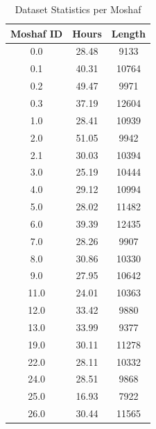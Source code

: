 \begin{table}[t]
	\centering
	\caption{Dataset Statistics per Moshaf}
	\label{tab:moshaf}
	\begin{tabular}{ccc}
		\hline
		\textbf{Moshaf ID} & \textbf{Hours}       & \textbf{Length} \\
		\hline
		0.0                & 28.48                & 9133            \\
		0.1                & 40.31                & 10764           \\
		0.2                & 49.47                & 9971            \\
		0.3                & 37.19                & 12604           \\
		1.0                & 28.41                & 10939           \\
		2.0                & 51.05                & 9942            \\
		2.1                & 30.03                & 10394           \\
		3.0                & 25.19                & 10444           \\
		4.0                & 29.12                & 10994           \\
		5.0                & 28.02                & 11482           \\
		6.0                & 39.39                & 12435           \\
		7.0                & 28.26                & 9907            \\
		8.0                & 30.86                & 10330           \\
		9.0                & 27.95                & 10642           \\
		11.0               & 24.01                & 10363           \\
		12.0               & 33.42                & 9880            \\
		13.0               & 33.99                & 9377            \\
		19.0               & 30.11                & 11278           \\
		22.0               & 28.11                & 10332           \\
		24.0               & 28.51                & 9868            \\
		25.0               & 16.93                & 7922            \\
		26.0               & 30.44                & 11565           \\

\end{tabular}
\end{table}
